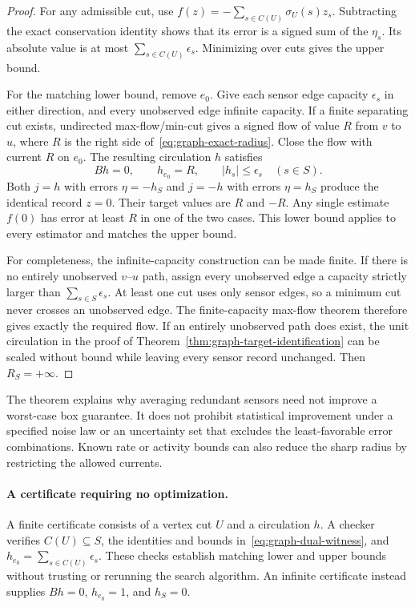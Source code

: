 \begin{proof}
For any admissible cut, use
$f(z)=-\sum_{s\in C(U)}\sigma_U(s)z_s$. Subtracting the exact conservation
identity shows that its error is a signed sum of the $\eta_s$. Its absolute
value is at most $\sum_{s\in C(U)}\epsilon_s$. Minimizing over cuts gives the
upper bound.

For the matching lower bound, remove $e_0$. Give each sensor edge capacity
$\epsilon_s$ in either direction, and every unobserved edge infinite
capacity. If a finite separating cut exists, undirected max-flow/min-cut gives
a signed flow of value $R$ from $v$ to $u$, where $R$ is the right side
of~\eqref{eq:graph-exact-radius}. Close the flow with current $R$ on $e_0$.
The resulting circulation $h$ satisfies
\begin{equation}
 Bh=0,\qquad h_{e_0}=R,\qquad |h_s|\leq\epsilon_s\quad(s\in S).
 \label{eq:graph-dual-witness}
\end{equation}
Both $j=h$ with errors $\eta=-h_S$ and $j=-h$ with errors $\eta=h_S$ produce
the identical record $z=0$. Their target values are $R$ and $-R$. Any single
estimate $f(0)$ has error at least $R$ in one of the two cases. This lower
bound applies to every estimator and matches the upper bound.

For completeness, the infinite-capacity construction can be made finite. If
there is no entirely unobserved $v$--$u$ path, assign every unobserved edge a
capacity strictly larger than $\sum_{s\in S}\epsilon_s$. At least one cut
uses only sensor edges, so a minimum cut never crosses an unobserved edge.
The finite-capacity max-flow theorem therefore gives exactly the required
flow. If an entirely unobserved path does exist, the unit circulation in the
proof of Theorem~\ref{thm:graph-target-identification} can be scaled without
bound while leaving every sensor record unchanged. Then $R_S=+\infty$.
\end{proof}

The theorem explains why averaging redundant sensors need not improve a
worst-case box guarantee. It does not prohibit statistical improvement under a
specified noise law or an uncertainty set that excludes the least-favorable
error combinations. Known rate or activity bounds can also reduce the sharp
radius by restricting the allowed currents.

\paragraph{A certificate requiring no optimization.}
A finite certificate consists of a vertex cut $U$ and a circulation $h$. A
checker verifies $C(U)\subseteq S$, the identities and bounds
in~\eqref{eq:graph-dual-witness}, and
$h_{e_0}=\sum_{s\in C(U)}\epsilon_s$. These checks establish matching lower
and upper bounds without trusting or rerunning the search algorithm. An
infinite certificate instead supplies $Bh=0$, $h_{e_0}=1$, and $h_S=0$.

